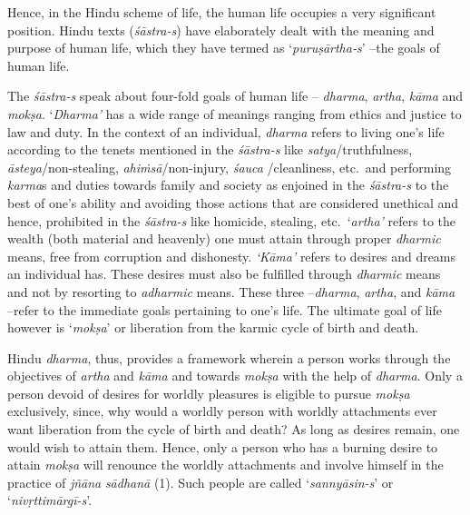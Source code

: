 Hence, in the Hindu scheme of life, the human life occupies a very significant position. Hindu texts (\emph{śāstra-s}) have elaborately dealt with the meaning and purpose of human life, which they have termed as `\emph{puruṣārtha-s}' --the goals of human life.
\vskip 4pt

The \emph{śāstra-s} speak about four-fold goals of human life -- \emph{dharma}, \emph{artha}, \emph{kāma} and \emph{mokṣa}. `\emph{Dharma'} has a wide range of meanings ranging from ethics and justice to law and duty. In the context of an individual, \emph{dharma} refers to living one's life according to the tenets mentioned in the \emph{śāstra-s} like \emph{satya}/truthfulness, \emph{āsteya}/non-stealing, \emph{ahiṁsā}/non-injury, \emph{śauca} /cleanliness, etc.\ and performing \emph{karma}s and duties towards family and society as enjoined in the \emph{śāstra-s} to the best of one's ability and avoiding those actions that are considered unethical and hence, prohibited in the \emph{śāstra-s} like homicide, stealing, etc.\ `\emph{artha'} refers to the wealth (both material and heavenly) one must attain through proper \emph{dharmic} means, free from corruption and dishonesty. \emph{`Kāma'} refers to desires and dreams an individual has. These desires must also be fulfilled through \emph{dharmic} means and not by resorting to \emph{adharmic} means. These three --\emph{dharma}, \emph{artha}, and \emph{kāma} --refer to the immediate goals pertaining to one's life. The ultimate goal of life however is `\emph{mokṣa}' or liberation from the karmic cycle of birth and death.
\vskip 4pt

Hindu \emph{dharma}, thus, provides a framework wherein a person works through the objectives of \emph{artha} and \emph{kāma} and towards \emph{mokṣa} with the help of \emph{dharma}. Only a person devoid of desires for worldly pleasures is eligible to pursue \emph{mokṣa} exclusively, since, why would a worldly person with worldly attachments ever want liberation from the cycle of birth and death? As long as desires remain, one would wish to attain them. Hence, only a person who has a burning desire to attain \emph{mokṣa} will renounce the worldly attachments and involve himself in the practice of \emph{jñāna} \emph{sādhanā} (1). Such people are called `\emph{sannyāsin-s}' or `\emph{nivṛttimārgī-s}'.

